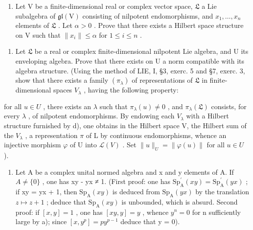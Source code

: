 \begin{enumerate}
\def\labelenumi{\alph{enumi})}
\setcounter{enumi}{3}
\tightlist
\item
  Let V be a finite-dimensional real or complex vector space, \(\mathfrak{L}\) a Lie subalgebra of \(\mathfrak{gl}(\mathrm{V})\) consisting of nilpotent endomorphisms, and \(x_{1},\ldots ,x_{n}\) elements of \(\mathfrak{L}\) . Let \(\alpha >0\) . Prove that there exists a Hilbert space structure on V such that \(\| x_i\| \leqslant \alpha\) for \(1\leqslant i\leqslant n\) .
\end{enumerate}

\begin{enumerate}
\def\labelenumi{\alph{enumi})}
\setcounter{enumi}{4}
\tightlist
\item
  Let \(\mathfrak{L}\) be a real or complex finite-dimensional nilpotent Lie algebra, and U its enveloping algebra. Prove that there exists on U a norm compatible with its algebra structure. (Using the method of LIE, I, §3, exerc. 5 and §7, exerc. 3, show that there exists a family \((\pi_{\lambda})\) of representations of \(\mathfrak{L}\) in finite-dimensional spaces \(V_{\lambda}\) , having the following property:
\end{enumerate}

for all \(u \in U\) , there exists an \(\lambda\) such that \(\pi_{\lambda}(u) \neq 0\) , and \(\pi_{\lambda}(\mathfrak{L})\) consists, for every \(\lambda\) , of nilpotent endomorphisms. By endowing each \(V_{\lambda}\) with a Hilbert structure furnished by d), one obtains in the Hilbert space V, the Hilbert sum of the \(V_{\lambda}\) , a representation \(\pi\) of L by continuous endomorphisms, whence an injective morphism \(\varphi\) of U into \(\mathcal{L}(V)\) . Set \(\|u\|_{U} = \|\varphi(u)\|\) for all \(u \in U\) ).

\begin{enumerate}
\def\labelenumi{\alph{enumi})}
\setcounter{enumi}{5}
\tightlist
\item
  Let A be a complex unital normed algebra and x and y elements of A. If \(A \neq \{0\}\) , one has xy - yx ≠ 1. (First proof: one has \(\mathrm{Sp}_{\mathrm{A}}^{\prime}(xy) = \mathrm{Sp}_{\mathrm{A}}^{\prime}(yx)\) ; if xy = yx + 1, then \(\mathrm{Sp}_{\mathrm{A}}(xy)\) is deduced from \(\mathrm{Sp}_{\mathrm{A}}(yx)\) by the translation \(z \mapsto z + 1\) ; deduce that \(\mathrm{Sp}_{\mathrm{A}}(xy)\) is unbounded, which is absurd. Second proof: if \([x, y] = 1\) , one has \([xy, y] = y\) , whence \(y^{n} = 0\) for n sufficiently large by a); since \([x, y^{p}] = py^{p-1}\) deduce that y = 0).
\end{enumerate}

